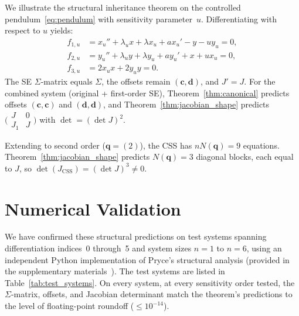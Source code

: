 \documentclass[12pt,a4paper]{article}
\theoremstyle{definition}
\theoremstyle{plain}
\theoremstyle{remark}
\newcommand{\vq}{\mathbf{q}}
\newcommand{\vc}{\mathbf{c}}
\newcommand{\vd}{\mathbf{d}}
\begin{document}
We illustrate the structural inheritance theorem on the controlled pendulum~\eqref{eq:pendulum} with sensitivity parameter~$u$. Differentiating with respect to $u$ yields:
\begin{align}
  f_{1,u} &= x_u'' + \lambda_u x + \lambda x_u + a x_u' - y - u y_u = 0,\nonumber\\
  f_{2,u} &= y_u'' + \lambda_u y + \lambda y_u + a y_u' + x + u x_u = 0,\\
  f_{3,u} &= 2x_u x + 2y_u y = 0.\label{eq:pendulum_se}
\end{align}
The SE $\Sigma$-matrix equals $\Sigma$, the offsets remain $(\vc,\vd)$, and $J' = J$. For the combined system (original + first-order SE), Theorem~\ref{thm:canonical} predicts offsets $(\vc,\vc)$ and $(\vd,\vd)$, and Theorem~\ref{thm:jacobian_shape} predicts $\bigl(\begin{smallmatrix}J&0\\ J_1&J\end{smallmatrix}\bigr)$ with $\det = (\det J)^2$.

Extending to second order ($\vq=(2)$), the CSS has $n N(\vq)=9$ equations. Theorem~\ref{thm:jacobian_shape} predicts $N(\vq)=3$ diagonal blocks, each equal to $J$, so $\det(J_{\text{CSS}}) = (\det J)^3 \neq 0$.

\section{Numerical Validation}

We have confirmed these structural predictions on test systems spanning differentiation indices~0 through~5 and system sizes $n=1$ to $n=6$, using an independent Python implementation of Pryce's structural analysis (provided in the supplementary materials~\cite{supplement}). The test systems are listed in Table~\ref{tab:test_systems}. On every system, at every sensitivity order tested, the $\Sigma$-matrix, offsets, and Jacobian determinant match the theorem's predictions to the level of floating-point roundoff ($\le 10^{-14}$).
\end{document}
